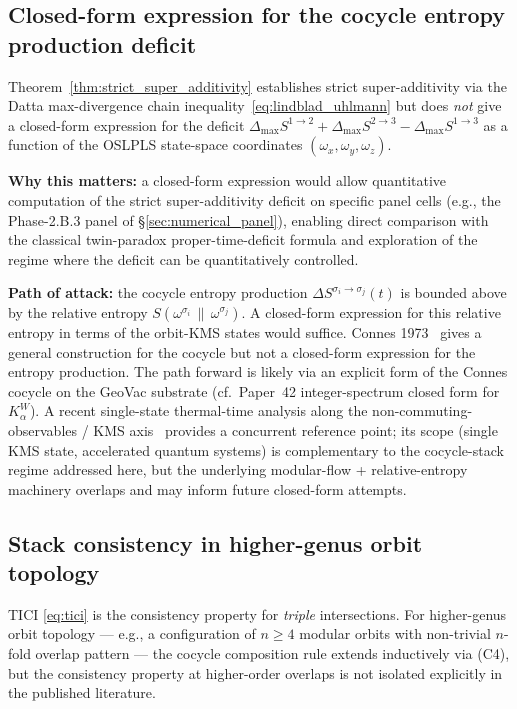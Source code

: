 \documentclass[11pt,a4paper]{article}
\theoremstyle{plain}
\theoremstyle{definition}
\newcommand{\Kalpha}{K_{\alpha}^{W}}
\newcommand{\omegaOrb}[1]{\omega^{\sigma_{#1}}}
\newcommand{\DelS}[2]{\Delta S^{\sigma_{#1}\to\sigma_{#2}}}
\begin{document}
\subsection{Closed-form expression for the cocycle entropy production
deficit}\label{sec:open_cocycle_entropy}

Theorem~\ref{thm:strict_super_additivity} establishes strict
super-additivity via the Datta max-divergence chain
inequality~\eqref{eq:lindblad_uhlmann} but does \emph{not} give a closed-form
expression for the deficit $\Delta_{\max}S^{1\to 2}+\Delta_{\max}S^{2\to 3}-\Delta_{\max}S^{1\to 3}$ as a
function of the OSLPLS state-space coordinates
$(\omega_{x},\omega_{y},\omega_{z})$.

\textbf{Why this matters:} a closed-form expression would allow
quantitative computation of the strict super-additivity deficit on
specific panel cells (e.g., the Phase-2.B.3 panel of
\S\ref{sec:numerical_panel}), enabling direct comparison with the
classical twin-paradox proper-time-deficit formula and exploration
of the regime where the deficit can be quantitatively controlled.

\textbf{Path of attack:} the cocycle entropy production
$\DelS{i}{j}(t)$ is bounded above by the relative entropy
$S(\omegaOrb{i}\,\|\,\omegaOrb{j})$. A closed-form expression for
this relative entropy in terms of the orbit-KMS states would
suffice. Connes 1973~\cite{connes1973} gives a general construction
for the cocycle but not a closed-form expression for the entropy
production. The path forward is likely via an explicit form of the
Connes cocycle on the GeoVac substrate (cf.\ Paper~42
\cite{paper42} integer-spectrum closed form for $\Kalpha$). A
recent single-state thermal-time analysis along the
non-commuting-observables / KMS axis~\cite{rotondo2026} provides a
concurrent reference point; its scope (single KMS state, accelerated
quantum systems) is complementary to the cocycle-stack regime
addressed here, but the underlying modular-flow + relative-entropy
machinery overlaps and may inform future closed-form attempts.

\subsection{Stack consistency in higher-genus orbit topology}
\label{sec:open_higher_genus}

TICI \eqref{eq:tici} is the consistency property for \emph{triple}
intersections. For higher-genus orbit topology --- e.g., a
configuration of $n\ge 4$ modular orbits with non-trivial $n$-fold
overlap pattern --- the cocycle composition rule extends inductively
via (C4), but the consistency property at higher-order overlaps is
not isolated explicitly in the published literature.
\end{document}
